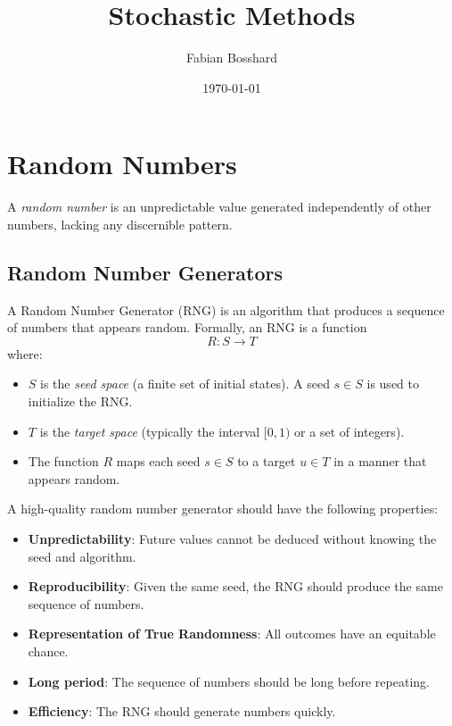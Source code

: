 \documentclass[11pt, headings=standardclasses, parskip=half, twoside]{scrartcl}
\title{Stochastic Methods}
\author{Fabian Bosshard}
\date{\today}
\begin{document}
\maketitle


\thispagestyle{empty}
\tableofcontents



\clearpage
{}
\section{Random Numbers}
A \textit{random number} is an unpredictable value generated independently of other numbers, lacking any discernible pattern.

\subsection{Random Number Generators}

\begin{definition}
    A Random Number Generator (RNG) is an algorithm that produces a sequence of numbers that appears random. Formally, an RNG is a function
    \[
    R: S \rightarrow T
    \]
    where:
    \begin{itemize}[before={\parskip=0pt}, nosep]
        \item $S$ is the \textit{seed space} (a finite set of initial states). A seed \(s \in S\) is used to initialize the RNG.
        \item $T$ is the \textit{target space} (typically the interval $[0,1)$ or a set of integers).
        \item The function $R$ maps each seed $s \in S$ to a target $u \in T$ in a manner that appears random. \qedhere
    \end{itemize}
\end{definition}

A high-quality random number generator should have the following properties:
    \begin{itemize}[before={\parskip=0pt}, nosep]
        \item \textbf{Unpredictability}: Future values cannot be deduced without knowing the seed and algorithm.
        \item \textbf{Reproducibility}: Given the same seed, the RNG should produce the same sequence of numbers.
        \item \textbf{Representation of True Randomness}: All outcomes have an equitable chance.
        \item \textbf{Long period}: The sequence of numbers should be long before repeating.
        \item \textbf{Efficiency}: The RNG should generate numbers quickly.
    \end{itemize}
\end{document}
